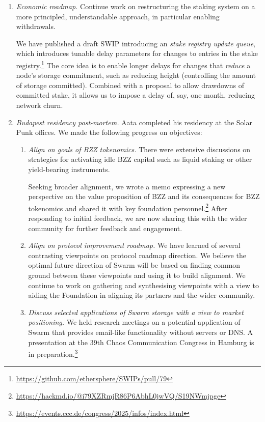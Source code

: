 \begin{enumerate}
  \item \emph{Economic roadmap.} Continue work on restructuring the staking system on a more principled, understandable approach, in particular enabling withdrawals.

  We have published a draft SWIP introducing an \emph{stake registry update queue}, which introduces tunable delay parameters for changes to entries in the stake registry.\footnote{\url{https://github.com/ethersphere/SWIPs/pull/79}}
  The core idea is to enable longer delays for changes that \emph{reduce} a node's storage commitment, such as reducing height (controlling the amount of storage committed).
  Combined with a proposal to allow drawdowns of committed stake, it allows us to impose a delay of, say, one month, reducing network churn.

  \item \emph{Budapest residency post-mortem.} Aata completed his residency at the Solar Punk offices.
  We made the following progress on objectives:
  \begin{enumerate}
    \item \emph{Align on goals of BZZ tokenomics.} 
    There were extensive discussions on strategies for activating idle BZZ capital such as liquid staking or other yield-bearing instruments.
    
    Seeking broader alignment, we wrote a memo expressing a new perspective on the value proposition of BZZ and its consequences for BZZ tokenomics and shared it with key foundation personnel.\footnote{\url{https://hackmd.io/@i79XZRmjR86P6AbhL0jwVQ/S19NWmjpge}}
    After responding to initial feedback, we are now sharing this with the wider community for further feedback and engagement.
    \item \emph{Align on protocol improvement roadmap.} 
    We have learned of several contrasting viewpoints on protocol roadmap direction.
    We believe the optimal future direction of Swarm will be based on finding common ground between these viewpoints and using it to build alignment.
    We continue to work on gathering and synthesising viewpoints with a view to aiding the Foundation in aligning its partners and the wider community.

    \item \emph{Discuss selected applications of Swarm storage with a view to market positioning.} 
    We held research meetings on a potential application of Swarm that provides email-like functionality without servers or DNS. A presentation at the 39th Chaos Communication Congress in Hamburg is in preparation.\footnote{\url{https://events.ccc.de/congress/2025/infos/index.html}}
  \end{enumerate}
  
\end{enumerate}

